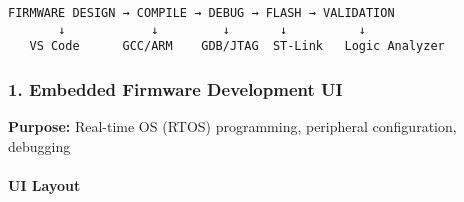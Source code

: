 \documentclass[
]{article}
\begin{document}
\begin{verbatim}
FIRMWARE DESIGN → COMPILE → DEBUG → FLASH → VALIDATION
       ↓            ↓         ↓       ↓          ↓
   VS Code      GCC/ARM    GDB/JTAG  ST-Link   Logic Analyzer
\end{verbatim}

\hypertarget{embedded-firmware-development-ui}{%
\subsubsection{1. Embedded Firmware Development
UI}\label{embedded-firmware-development-ui}}

\textbf{Purpose:} Real-time OS (RTOS) programming, peripheral
configuration, debugging

\hypertarget{ui-layout-4}{%
\paragraph{UI Layout}\label{ui-layout-4}}
\end{document}
